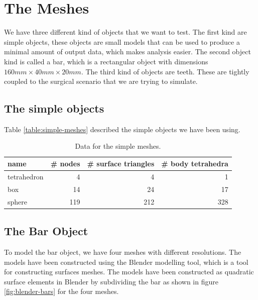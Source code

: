 \section{The Meshes}
We have three different kind of objects that we want to test.
%
The first kind are simple objects, these objects are small models that
can be used to produce a minimal amount of output data, which makes
analysis easier.
%
The second object kind is called a bar, which is a rectangular object with
dimensions $160mm \times 40mm \times 20mm$.
%
The third kind of objects are teeth. These are tightly coupled to the
surgical scenario that we are trying to simulate.

\layoutnewpage

\subsection{The simple objects}
Table \vref{table:simple-meshes} described the simple objects we have
been using.

\begin{table}
  \centering
  \begin{tabular}{| l | r | r | r |}
    \hline
    name & \# nodes & \# surface triangles & \# body tetrahedra \\
    \hline
    tetrahedron & 4 & 4 & 1 \\
    box & 14 & 24 & 17 \\
    sphere & 119 & 212 & 328 \\
    \hline
  \end{tabular}
  \caption{Data for the simple meshes.}
  \label{table:simple-meshes}
\end{table}

\subsection{The Bar Object}
\label{sec:bar-mesh}
To model the bar object, we have four meshes with different resolutions.
%
The models have been constructed using the Blender modelling tool,
which is a tool for constructing surfaces meshes. The models have been
constructed as quadratic surface elements in Blender by subdividing
the bar as shown in figure \vref{fig:blender-bars} for the four meshes.


